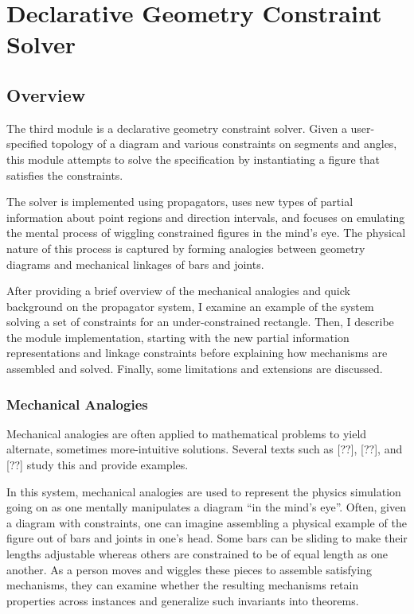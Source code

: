 \chapter{Declarative Geometry Constraint Solver}
\label{chap:declarative}

\section{Overview}

The third module is a declarative geometry constraint solver. Given a
user-specified topology of a diagram and various constraints on
segments and angles, this module attempts to solve the specification
by instantiating a figure that satisfies the constraints.

The solver is implemented using propagators, uses new types of partial
information about point regions and direction intervals, and focuses
on emulating the mental process of wiggling constrained figures in the
mind's eye. The physical nature of this process is captured by forming
analogies between geometry diagrams and mechanical linkages of bars
and joints.

After providing a brief overview of the mechanical analogies and quick
background on the propagator system, I examine an example of the
system solving a set of constraints for an under-constrained
rectangle. Then, I describe the module implementation, starting with
the new partial information representations and linkage constraints
before explaining how mechanisms are assembled and solved. Finally,
some limitations and extensions are discussed.


\subsection{Mechanical Analogies}

Mechanical analogies are often applied to mathematical problems to
yield alternate, sometimes more-intuitive solutions. Several texts
such as [??], [??], and [??] study this and provide examples.

In this system, mechanical analogies are used to represent the physics
simulation going on as one mentally manipulates a diagram ``in the
mind's eye''. Often, given a diagram with constraints, one can imagine
assembling a physical example of the figure out of bars and joints in
one's head.  Some bars can be sliding to make their lengths adjustable
whereas others are constrained to be of equal length as one another.
As a person moves and wiggles these pieces to assemble satisfying
mechanisms, they can examine whether the resulting mechanisms retain
properties across instances and generalize such invariants into
theorems.

